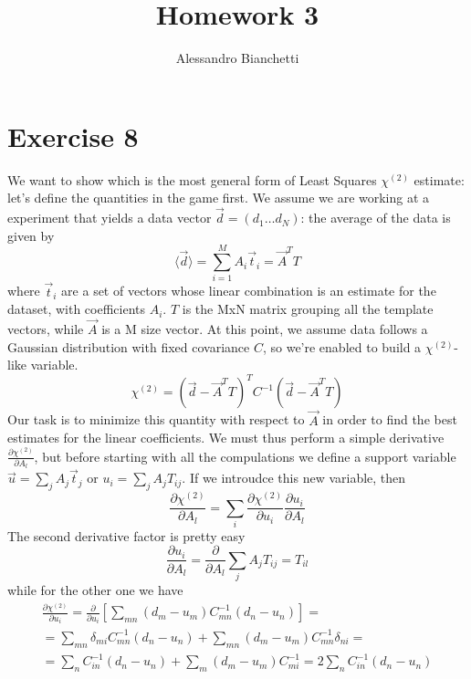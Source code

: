 \documentclass[a4paper,11pt,fleqn]{article}
\title{Homework 3}
\author{Alessandro Bianchetti}
\begin{document}
\maketitle

\section{Exercise 8}
We want to show which is the most general form of Least Squares $\chi^{(2)}$
estimate: let's define the quantities in the game first. We assume we are 
working at a experiment that yields a data vector $\vec{d}=(d_1 \dotsc d_N)$: 
the average of the data is given by 
\begin{equation}
    \langle \vec{d} \rangle = \sum_{i=1}^M A_i \vec{t}_i = \vec{A}^TT    
\end{equation}
where $\vec{t}_i$ are a set of vectors whose linear combination is an 
estimate for the dataset, with coefficients $A_i$. $T$ is the MxN matrix 
grouping all the template vectors, while $\vec{A}$ is a M size vector. 
At this point, we assume data follows a Gaussian distribution with fixed 
covariance $C$, so we're enabled to build a $\chi^{(2)}$-like variable.
\begin{equation}
    \chi^{(2)}=(\vec{d}-\vec{A}^TT)^T C^{-1}(\vec{d}-\vec{A}^TT)
\end{equation} 
Our task is to minimize this quantity with respect to $\vec{A}$ in order to 
find the best estimates for the linear coefficients. We must thus perform 
a simple derivative $\frac{\partial \chi^{(2)}}{\partial A_l}$, but before 
starting with all the compulations we define a support variable 
$\vec{u} = \sum_jA_j\vec{t}_j$ or $u_i = \sum_j A_j T_{ij}$. If we 
introudce this new variable, then 
\begin{equation}
    \label{eqn:der}
    \frac{\partial \chi^{(2)}}{\partial A_l} = \sum_i \frac{\partial \chi^{(2)}}{\partial u_i}\frac{\partial u_i}{\partial A_l}
\end{equation}
The second derivative factor is pretty easy
\begin{equation*}
    \frac{\partial u_i}{\partial A_l} = \frac{\partial }{\partial A_l} \sum_j A_j T_{ij} = T_{il} 
\end{equation*}
while for the other one we have 
\begin{gather*}
    \frac{\partial \chi^{(2)}}{\partial u_i} = \frac{\partial}{\partial u_i}\left[\sum_{mn}(d_m-u_m)C^{-1}_{mn}(d_n-u_n)\right] = \\ 
    = \sum_{mn}\delta_{mi}C^{-1}_{mn}(d_n-u_n) + \sum_{mn}(d_m-u_m)C^{-1}_{mn}\delta_{ni} = \\ 
    = \sum_{n}C^{-1}_{in}(d_n-u_n) + \sum_{m}(d_m-u_m)C^{-1}_{mi} = 2\sum_n C^{-1}_{in}(d_n-u_n) 
\end{gather*}
\end{document}
